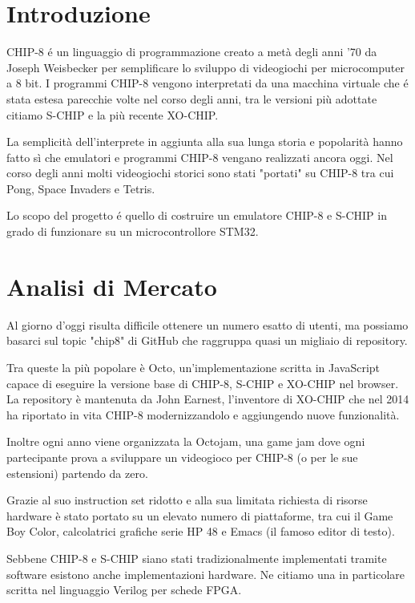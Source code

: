 \documentclass[a4paper]{article}
\begin{document}
\setlength{\parindent}{0pt}
\setlength{\parskip}{0.8em}
\linespread{1.5}

\section{Introduzione}

CHIP-8 é un linguaggio di programmazione creato a metà degli anni '70 da Joseph Weisbecker per semplificare lo sviluppo di videogiochi per microcomputer a 8 bit. I programmi CHIP-8 vengono interpretati da una macchina virtuale che é stata estesa parecchie volte nel corso degli anni, tra le versioni più adottate citiamo S-CHIP e la più recente XO-CHIP.

La semplicità dell'interprete in aggiunta alla sua lunga storia e popolarità hanno fatto sì che emulatori e programmi CHIP-8 vengano realizzati ancora oggi. Nel corso degli anni molti videogiochi storici sono stati "portati" su CHIP-8 tra cui Pong, Space Invaders e Tetris.

Lo scopo del progetto é quello di costruire un emulatore CHIP-8 e S-CHIP in grado di funzionare su un microcontrollore STM32.

\section{Analisi di Mercato}

Al giorno d'oggi risulta difficile ottenere un numero esatto di utenti, ma possiamo basarci sul topic "chip8" di GitHub che raggruppa quasi un migliaio di repository.

Tra queste la più popolare è Octo, un'implementazione scritta in JavaScript capace di eseguire la versione base di CHIP-8, S-CHIP e XO-CHIP nel browser. La repository è mantenuta da John Earnest, l'inventore di XO-CHIP che nel 2014 ha riportato in vita CHIP-8 modernizzandolo e aggiungendo nuove funzionalità.

Inoltre ogni anno viene organizzata la Octojam, una game jam dove ogni partecipante prova a sviluppare un videogioco per CHIP-8 (o per le sue estensioni) partendo da zero.

Grazie al suo instruction set ridotto e alla sua limitata richiesta di risorse hardware è stato portato su un elevato numero di piattaforme, tra cui il Game Boy Color, calcolatrici grafiche serie HP 48 e Emacs (il famoso editor di testo).

Sebbene CHIP-8 e S-CHIP siano stati tradizionalmente implementati tramite software esistono anche implementazioni hardware. Ne citiamo una in particolare scritta nel linguaggio Verilog per schede FPGA.
\end{document}
